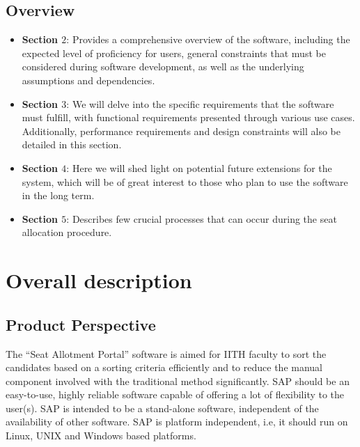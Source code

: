 \documentclass{report}
\begin{document}
\section{Overview}
\begin{itemize}
    \item \textbf{Section $2$}: Provides a comprehensive overview of the software, including the expected level of proficiency for users, general constraints that must be considered during software development, as well as the underlying assumptions and dependencies. 
    \item \textbf{Section $3$}: We will delve into the specific requirements that the software must fulfill, with functional requirements presented through various use cases. Additionally, performance requirements and design constraints will also be detailed in this section.
    \item \textbf{Section $4$}: Here we will shed light on potential future extensions for the system, which will be of great interest to those who plan to use the software in the long term.
    \item \textbf{Section $5$}: Describes few crucial processes that can occur during the seat allocation procedure.  
\end{itemize}
\chapter{Overall description}
\section{Product Perspective}
\begin{tcolorbox}[colframe=white, colback=lightblue, arc=8pt]
    The “Seat Allotment Portal” software is aimed for IITH faculty to sort the candidates based on a sorting criteria efficiently and to reduce the manual component involved with the traditional method significantly. 
    SAP should be an easy-to-use, highly reliable software capable of offering a lot of flexibility to the user(s). SAP is intended to be a stand-alone software, independent of the availability of other software. 
    SAP is platform independent, i.e, it should run on Linux, UNIX and Windows based platforms. 
\end{tcolorbox}
\newpage
\end{document}
